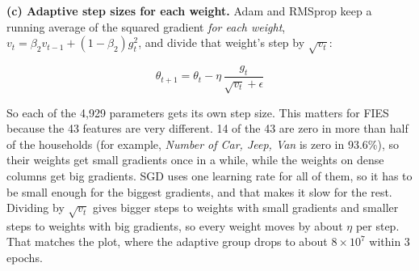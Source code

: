 \documentclass[12pt,a4paper]{article}
\begin{document}
\begin{answerbox}
\textbf{(c) Adaptive step sizes for each weight.} Adam and RMSprop keep a running average of the squared gradient \emph{for each weight}, \(v_t = \beta_2 v_{t-1} + (1-\beta_2)g_t^2\), and divide that weight's step by \(\sqrt{v_t}\):

\[\theta_{t+1} = \theta_t - \eta\,\frac{g_t}{\sqrt{v_t}+\epsilon}\]

So each of the 4,929 parameters gets its own step size. This matters for FIES because the 43 features are very different. 14 of the 43 are zero in more than half of the households (for example, \emph{Number of Car, Jeep, Van} is zero in 93.6\%), so their weights get small gradients once in a while, while the weights on dense columns get big gradients. SGD uses one learning rate for all of them, so it has to be small enough for the biggest gradients, and that makes it slow for the rest. Dividing by \(\sqrt{v_t}\) gives bigger steps to weights with small gradients and smaller steps to weights with big gradients, so every weight moves by about \(\eta\) per step. That matches the plot, where the adaptive group drops to about \(8\times10^7\) within 3 epochs.

\end{answerbox}
\end{document}
